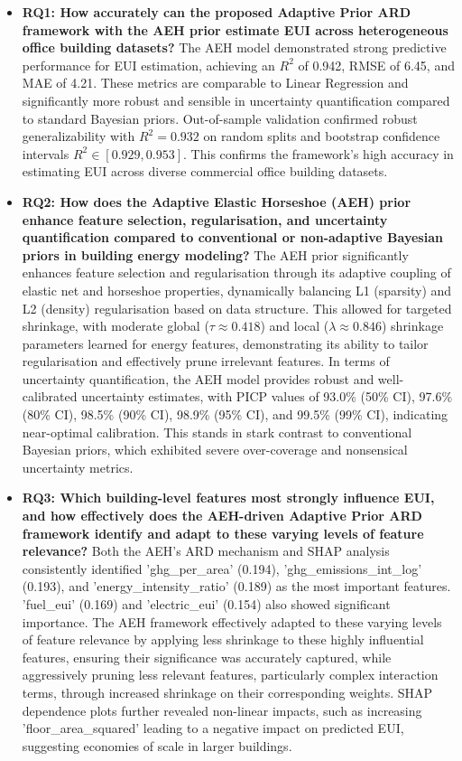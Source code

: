 \begin{itemize}
\item \textbf{RQ1: How accurately can the proposed Adaptive Prior ARD framework with the AEH prior estimate EUI across heterogeneous office building datasets?}
The AEH model demonstrated strong predictive performance for EUI estimation, achieving an $R^2$ of 0.942, RMSE of 6.45, and MAE of 4.21. These metrics are comparable to Linear Regression and significantly more robust and sensible in uncertainty quantification compared to standard Bayesian priors. Out-of-sample validation confirmed robust generalizability with $R^2 = 0.932$ on random splits and bootstrap confidence intervals $R^2 \in [0.929, 0.953]$. This confirms the framework's high accuracy in estimating EUI across diverse commercial office building datasets.

\item \textbf{RQ2: How does the Adaptive Elastic Horseshoe (AEH) prior enhance feature selection, regularisation, and uncertainty quantification compared to conventional or non-adaptive Bayesian priors in building energy modeling?}
The AEH prior significantly enhances feature selection and regularisation through its adaptive coupling of elastic net and horseshoe properties, dynamically balancing L1 (sparsity) and L2 (density) regularisation based on data structure. This allowed for targeted shrinkage, with moderate global ($\tau \approx 0.418$) and local ($\lambda \approx 0.846$) shrinkage parameters learned for energy features, demonstrating its ability to tailor regularisation and effectively prune irrelevant features. In terms of uncertainty quantification, the AEH model provides robust and well-calibrated uncertainty estimates, with PICP values of 93.0\% (50\% CI), 97.6\% (80\% CI), 98.5\% (90\% CI), 98.9\% (95\% CI), and 99.5\% (99\% CI), indicating near-optimal calibration. This stands in stark contrast to conventional Bayesian priors, which exhibited severe over-coverage and nonsensical uncertainty metrics.

\item \textbf{RQ3: Which building-level features most strongly influence EUI, and how effectively does the AEH-driven Adaptive Prior ARD framework identify and adapt to these varying levels of feature relevance?}
Both the AEH's ARD mechanism and SHAP analysis consistently identified 'ghg\_per\_area' (0.194), 'ghg\_emissions\_int\_log' (0.193), and 'energy\_intensity\_ratio' (0.189) as the most important features. 'fuel\_eui' (0.169) and 'electric\_eui' (0.154) also showed significant importance. The AEH framework effectively adapted to these varying levels of feature relevance by applying less shrinkage to these highly influential features, ensuring their significance was accurately captured, while aggressively pruning less relevant features, particularly complex interaction terms, through increased shrinkage on their corresponding weights. SHAP dependence plots further revealed non-linear impacts, such as increasing 'floor\_area\_squared' leading to a negative impact on predicted EUI, suggesting economies of scale in larger buildings.


\end{itemize}
